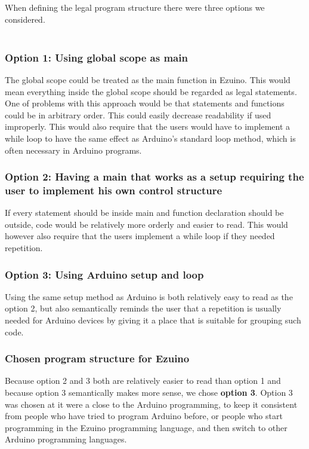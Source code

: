When defining the legal program structure there were three options we considered. \\ \\
\subsubsection{Option 1: Using global scope as main}
The global scope could be treated as the main function in Ezuino. This would mean everything inside the global scope should be regarded as legal statements. One of problems with this approach would be that statements and functions could be in arbitrary order. This could easily decrease readability if used improperly.
This would also require that the users would have to implement a while loop to have the same effect as Arduino’s standard loop method, which is often necessary in Arduino programs.


\subsubsection{Option 2: Having a main that works as a setup requiring the user to implement his own control structure}
If every statement should be inside main and function declaration should be outside, code would be relatively more orderly and easier to read.
This would however also require that the users implement a while loop if they needed repetition.


\subsubsection{Option 3: Using Arduino setup and loop}
Using the same setup method as Arduino is both relatively easy to read as the option 2, but also semantically reminds the user that a repetition is usually needed for Arduino devices by giving it a place that is suitable for grouping such code.


\subsubsection{Chosen program structure for Ezuino}
Because option 2 and 3 both are relatively easier to read than option 1 and because option 3 semantically makes more sense, we chose \textbf{option 3}. Option 3 was chosen at it were a close to the Arduino programming, to keep it consistent from people who have tried to program Arduino before, or people who start programming in the Ezuino programming language, and then switch to other Arduino programming languages.


